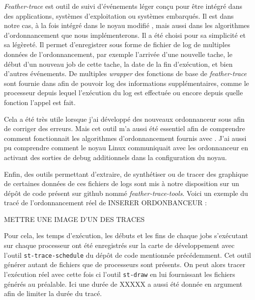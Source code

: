 \textit{Feather-trace} \cite{brandenburg2007feather} est outil de suivi d'événements léger conçu pour être intégré dans des applications,  systèmes d'exploitation ou systèmes embarqués. Il est dans notre cas, à la fois intégré dans le noyau modifié \litmus, mais aussi dans les algorithmes d'ordonnancement que nous implémenterons. Il a été choisi pour sa simplicité et sa légèreté. Il permet d'enregistrer sous forme de fichier de log de multiples données de l'ordonnancement, par exemple l'arrivée d'une nouvelle tache, le début d'un nouveau job de cette tache, la date de la fin d'exécution, et bien d'autres événements. De multiples \textit{wrapper} des fonctions de base de \textit{feather-trace} sont fournie dans \litmus afin de pouvoir log des informations supplémentaires, comme le processeur depuis lequel l’exécution du log est effectuée ou encore depuis quelle fonction l'appel est fait.

Cela a été très utile lorsque j'ai développé des nouveaux ordonnanceur sous \litmus afin de corriger des erreurs. Mais cet outil m'a aussi été essentiel afin de comprendre comment fonctionnait les algorithmes d’ordonnancement fournis avec \litmus. J'ai aussi pu comprendre comment le noyau Linux communiquait avec les ordonnanceur en activant des sorties de debug additionnels dans la configuration du noyau.

Enfin, des outils permettant d'extraire, de synthétiser ou de tracer des graphique de certaines données de ces fichiers de logs sont mis à notre disposition sur un dépôt de code présent sur github nommé \textit{feather-trace-tools}. Voici un exemple du tracé de l'ordonnancement réel de \color{red} INSERER ORDONBANCEUR \color{black} :

\begin{center}
     \color{red} METTRE UNE IMAGE D'UN DES TRACES
\end{center}

Pour cela, les temps d'exécution, les débuts et les fins de chaque jobs s'exécutant sur chaque processeur ont été enregistrés sur la carte de développement avec l'outil \texttt{st-trace-schedule} du dépôt de code mentionnée précédemment. Cet outil générer autant de fichiers que de processeurs sont présents. On peut alors tracer l’exécution réel avec cette fois ci l'outil \texttt{st-draw} en lui fournissant les fichiers générés au préalable. Ici une durée de \color{red} XXXXX \color{black} a aussi été donnée en argument afin de limiter la durée du tracé.